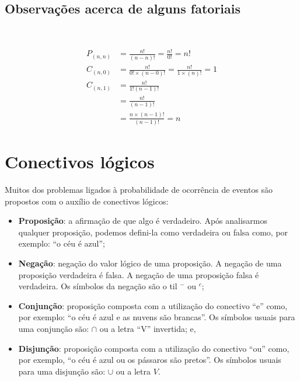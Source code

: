 \documentclass[
]{book}
\providecommand{\tightlist}{%
  \setlength{\itemsep}{0pt}\setlength{\parskip}{0pt}}
\begin{document}
\hfill\break

\hypertarget{observauxe7uxf5es-acerca-de-alguns-fatoriais}{%
\subsection{Observações acerca de alguns fatoriais}\label{observauxe7uxf5es-acerca-de-alguns-fatoriais}}

~

\begin{align*}
P_{(n,n)} & = \frac{n!}{(n-n)!} = \frac{n!}{0!} = n! \\
C_{(n,0)} & = \frac{n!}{ 0! \times (n-0)! } = \frac{n!}{ 1 \times (n)!} = 1 \\
C_{(n,1)} & = \frac{n! }{ 1! (n-1)!} \\
   & = \frac{ n! }{(n-1)! } \\
   & = \frac{ n \times (n-1)! }{ (n-1)!} = n    
\end{align*}

\hypertarget{conectivos-luxf3gicos}{%
\section{Conectivos lógicos}\label{conectivos-luxf3gicos}}

Muitos dos problemas ligados à probabilidade de ocorrência de eventos são propostos com o auxílio de conectivos lógicos:

\hfill\break

\begin{itemize}
\tightlist
\item
  \textbf{Proposição}: a afirmação de que algo é verdadeiro. Após analisarmos qualquer proposição, podemos defini-la como verdadeira ou falsa como, por exemplo: ``o céu é azul'';
\item
  \textbf{Negação}: negação do valor lógico de uma proposição. A negação de uma proposição verdadeira é falsa. A negação de uma proposição falsa é verdadeira. Os símbolos da negação são o til \(^{-}\) ou \(^{c}\);
\item
  \textbf{Conjunção}: proposição composta com a utilização do conectivo ``e'' como, por exemplo: ``o céu é azul e as nuvens são brancas''. Os símbolos usuais para uma conjunção são: \(\cap\) ou a letra ``V'' invertida; e,
\item
  \textbf{Disjunção}: proposição composta com a utilização do conectivo ``ou'' como, por exemplo, ``o céu é azul ou os pássaros são pretos''. Os símbolos usuais para uma disjunção são: \(\cup\) ou a letra \(V\).
\end{itemize}
\end{document}
